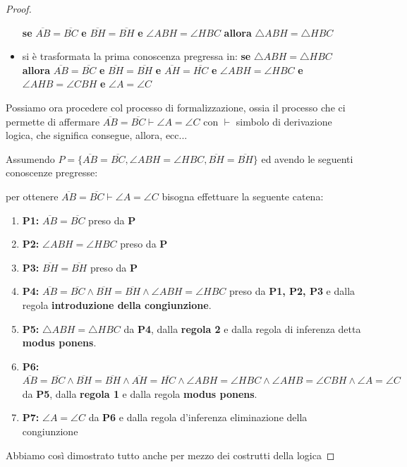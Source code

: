 \documentclass[a4paper]{report}
\begin{document}
\begin{proof}
\begin{itemize}
  \textbf{se} $\overline{AB}=\overline{BC}$ \textbf{e} $\overline{BH}=\overline{BH}$ \textbf{e} $\angle ABH = \angle HBC$
  \textbf{allora} $\triangle ABH=\triangle HBC$
\item si è trasformata la prima conoscenza pregressa in:\newline
  \textbf{se} $\triangle ABH=\triangle HBC$ \textbf{allora} $\overline{AB}=\overline{BC}$ \textbf{e} $\overline{BH}=\overline{BH}$
  \textbf{e} $\overline{AH}=\overline{HC}$ \textbf{e} $\angle ABH = \angle HBC$ \textbf{e} $\angle AHB = \angle CBH$ \textbf{e} $\angle A=\angle C$
\end{itemize}
Possiamo ora procedere col processo di formalizzazione, ossia il processo che ci permette di affermare
$\overline{AB} = \overline{BC} \vdash \angle A = \angle C$ con $\vdash$ simbolo di derivazione logica, che significa consegue, allora, ecc...

Assumendo $P = \{ \overline{AB} = \overline{BC}, \angle ABH = \angle HBC, \overline{BH} = \overline{BH} \}$
ed avendo le seguenti conoscenze pregresse:
per ottenere $ =  \vdash \angle A = \angle C$ bisogna effettuare la seguente catena:
\begin{enumerate}
\item \textbf{P1:} $=$ preso da \textbf{P}
\item \textbf{P2:} $\angle ABH = \angle HBC$ preso da \textbf{P}
\item \textbf{P3:} $=$ preso da \textbf{P}
\item \textbf{P4:} $ =  \land {} =  \land \angle ABH = \angle HBC$ preso da \textbf{P1, P2, P3} e       dalla regola \textbf{introduzione della congiunzione}.
\item \textbf{P5:} $\triangle ABH = \triangle HBC$ da \textbf{P4}, dalla \textbf{regola 2}  e dalla regola di inferenza detta \textbf{modus ponens}.
\item \textbf{P6:} $ =  \land {} =  \land {} =  \land
  \angle ABH = \angle HBC \land \angle AHB = \angle CBH \land \angle A=\angle C$ da \textbf{P5}, dalla \textbf{regola 1} e dalla regola
  \textbf{modus ponens}.
\item \textbf{P7:} $\angle A=\angle C$ da \textbf{P6} e dalla regola d'inferenza eliminazione della congiunzione 
\end{enumerate}
Abbiamo così dimostrato tutto anche per mezzo dei costrutti della logica
\end{proof}
\end{document}
